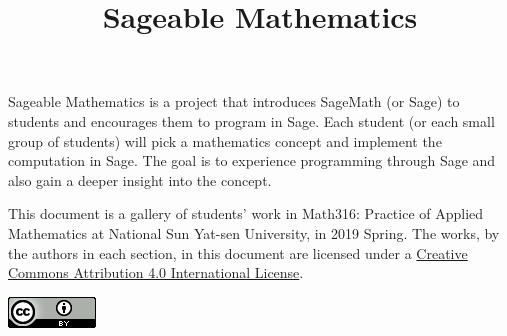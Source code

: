 \documentclass{article}
\title{Sageable Mathematics}
\begin{document}
\maketitle 

Sageable Mathematics is a project that introduces SageMath (or Sage) to students and encourages them to program in Sage.  Each student (or each small group of students) will pick a mathematics concept and implement the computation in Sage.  The goal is to experience programming through Sage and also gain a deeper insight into the concept.

This document is a gallery of students' work in Math316: Practice of Applied Mathematics at National Sun Yat-sen University, in 2019 Spring.  The works, by the authors in each section, in this document are licensed under a \href{http://creativecommons.org/licenses/by/4.0/}{Creative Commons Attribution 4.0 International License}.

\begin{flushright}
\includegraphics[scale=0.6]{88x31}
\end{flushright}

\tableofcontents 


\end{document}
